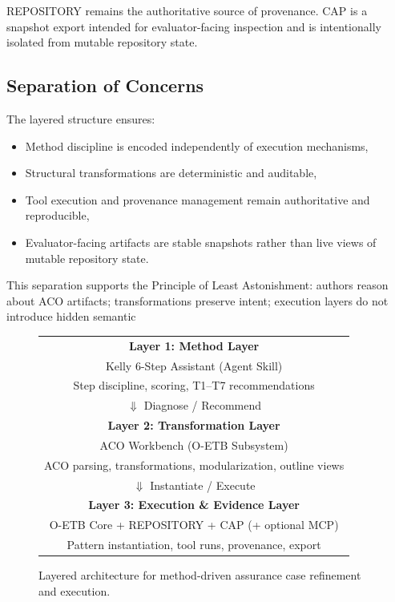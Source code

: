 \documentclass[12pt,twoside,a4paper]{article}
\begin{document}
REPOSITORY remains the authoritative source of provenance. CAP is a snapshot export intended for evaluator-facing inspection and is intentionally isolated from mutable repository state.

\subsection{Separation of Concerns}

The layered structure ensures:

\begin{itemize}
  \item Method discipline is encoded independently of execution mechanisms,
  \item Structural transformations are deterministic and auditable,
  \item Tool execution and provenance management remain authoritative and reproducible,
  \item Evaluator-facing artifacts are stable snapshots rather than live views of mutable repository state.
\end{itemize}

This separation supports the Principle of Least Astonishment: authors reason about ACO artifacts; transformations preserve intent; execution layers do not introduce hidden semantic

\begin{figure}[ht]
\centering
\begin{tabular}{|c|}
\hline
\textbf{Layer 1: Method Layer} \\
Kelly 6-Step Assistant (Agent Skill) \\
\small{Step discipline, scoring, T1--T7 recommendations} \\
\hline
$\Downarrow$ Diagnose / Recommend \\
\hline
\textbf{Layer 2: Transformation Layer} \\
ACO Workbench (O-ETB Subsystem) \\
\small{ACO parsing, transformations, modularization, outline views} \\
\hline
$\Downarrow$ Instantiate / Execute \\
\hline
\textbf{Layer 3: Execution \& Evidence Layer} \\
O-ETB Core + REPOSITORY + CAP (+ optional MCP) \\
\small{Pattern instantiation, tool runs, provenance, export} \\
\hline
\end{tabular}
\caption{Layered architecture for method-driven assurance case refinement and execution.}
\label{fig:Conceptual architecture}
\end{figure}
\end{document}
